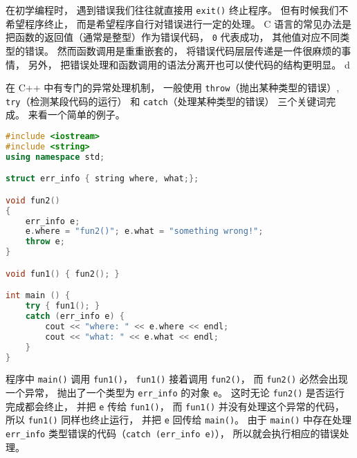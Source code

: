
\begin{issues}
\issueDraft
\end{issues}

在初学编程时， 遇到错误我们往往就直接用 \verb|exit()| 终止程序。 但有时候我们不希望程序终止， 而是希望程序自行对错误进行一定的处理。 C 语言的常见办法是把函数的返回值（通常是整型）作为错误代码， \verb|0| 代表成功， 其他值对应不同类型的错误。 然而函数调用是重重嵌套的， 将错误代码层层传递是一件很麻烦的事情， 另外， 把错误处理和函数调用的语法分离开也可以使代码的结构更明显。 d

在 C++ 中有专门的异常处理机制， 一般使用 \verb|throw|（抛出某种类型的错误）, \verb|try|（检测某段代码的运行） 和 \verb|catch|（处理某种类型的错误） 三个关键词完成。 来看一个简单的例子。

\begin{lstlisting}[language=cpp]
#include <iostream>
#include <string>
using namespace std;

struct err_info { string where, what;};

void fun2()
{
	err_info e;
	e.where = "fun2()"; e.what = "something wrong!";
	throw e;
}

void fun1() { fun2(); }

int main () {
	try { fun1(); }
	catch (err_info e) {
		cout << "where: " << e.where << endl;
		cout << "what: " << e.what << endl; 
	}
}
\end{lstlisting}
程序中 \verb|main()| 调用 \verb|fun1()|， \verb|fun1()| 接着调用 \verb|fun2()|， 而 \verb|fun2()| 必然会出现一个异常， 抛出了一个类型为 \verb|err_info| 的对象 \verb|e|。 这时无论 \verb|fun2()| 是否运行完成都会终止， 并把 \verb|e| 传给 \verb|fun1()|， 而 \verb|fun1()| 并没有处理这个异常的代码， 所以 \verb|fun1()| 同样也终止运行， 并把 \verb|e| 回传给 \verb|main()|。 由于 \verb|main()| 中存在处理 \verb|err_info| 类型错误的代码（\verb|catch (err_info e)|）， 所以就会执行相应的错误处理。
